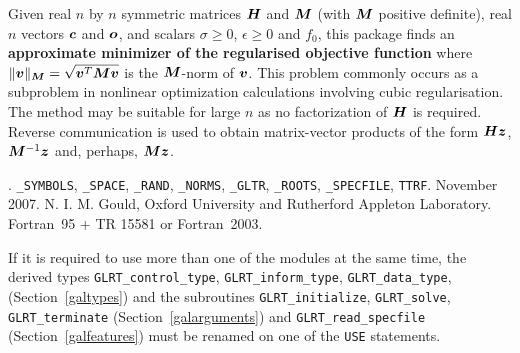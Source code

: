 \documentclass{galahad}
\newcommand{\packagename}{GL\-RT}
\newcommand{\fullpackagename}{\libraryname\_\packagename}
\begin{document}
\galheader


\galsummary
Given real $n$ by $n$ symmetric matrices ${\bm{H}}$ and ${\bm{M}}$
(with ${\bm{M}}$ positive definite), real
$n$ vectors ${\bm{c}}$ and ${\bm{o}}$, and scalars $\sigma\geq 0$, $\epsilon\geq 0$
and $f_0$, this package finds an
{\bf approximate minimizer of the regularised objective function}
where $\|  {\bm{v}} \|_{{\bm{M}}} = \sqrt{{\bm{v}}^T {\bm{M}} {\bm{v}}}$ is
the ${\bm{M}}$-norm of ${\bm{v}}$.
This problem commonly occurs as a subproblem in nonlinear
optimization calculations involving cubic regularisation.
The method may be suitable for large $n$ as no factorization of ${\bm{H}}$ is
required. Reverse communication is used to obtain
matrix-vector products of the form ${\bm{H}} {\bm{z}}$, ${\bm{M}}^{-1} {\bm{z}}$
and, perhaps, ${\bm{M}} {\bm{z}}$.



\galattributes
\galversions{\tt  \fullpackagename\_single, \fullpackagename\_double}.
\galuses
{\tt \libraryname\_SY\-M\-BOLS},
{\tt \libraryname\_SPACE}, {\tt \libraryname\_\-RAND},
{\tt \libraryname\_\-NORMS}, {\tt \libraryname\_\-GLTR},
{\tt \libraryname\_ROOTS}, {\tt \libraryname\_SPECFILE},
{\tt *TTRF}.
\galdate November 2007.
\galorigin N. I. M. Gould, Oxford University and Rutherford Appleton Laboratory.
\gallanguage Fortran~95 + TR 15581 or Fortran~2003.


\galhowto



\noindent
If it is required to use more than one of the modules at the same time, 
the derived types
{\tt \packagename\_control\_type}, {\tt \packagename\_inform\_type},
{\tt \packagename\_data\_type},
(Section~\ref{galtypes})
and the subroutines
{\tt \packagename\_initialize},
{\tt \packagename\_solve}, {\tt \packagename\_terminate}
(Section~\ref{galarguments})
and
{\tt \packagename\_read\_specfile}
(Section~\ref{galfeatures})
must be renamed on one of the {\tt USE} statements.




\end{document}
